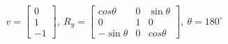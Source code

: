 \documentclass[preview]{standalone}
\begin{document}
\begin{align*}
v = \begin{bmatrix}
                        0\\
                        1\\
                        -1
                        \end{bmatrix}, \ 
                        R_y = \begin{bmatrix}
                        cos \theta & 0 & \sin \theta\\
                        0 & 1 & 0 \\
                        -\sin \theta & 0 & cos \theta 
                        \end{bmatrix}, \ 
                        \theta = 180^\circ
\end{align*}
\end{document}

